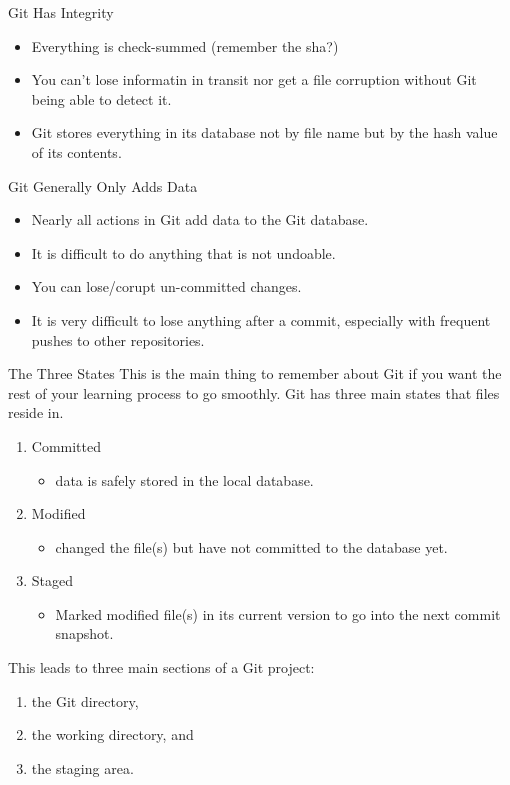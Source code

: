 \begin{frame}[t]{Git Has Integrity}
  \begin{itemize}
    \item Everything is check-summed (remember the sha?)
    \item You can't lose informatin in transit nor get a file corruption without
      Git being able to detect it.
    \item Git stores everything in its database not by file name but by the hash
      value of its contents.
  \end{itemize}
\end{frame}

\begin{frame}[t]{Git Generally Only Adds Data}
  \begin{itemize}
    \item Nearly all actions in Git add data to the Git database.
    \item It is difficult to do anything that is not undoable.
    \item You can lose/corupt un-committed changes.
    \item It is very difficult to lose anything after a commit, especially with
      frequent pushes to other repositories.
  \end{itemize}
\end{frame}

\begin{frame}[t]{The Three States}
  This is the main thing to remember about Git if you want the rest of your
  learning process to go smoothly.  Git has three main states that files reside
  in.

  \begin{enumerate}
    \item Committed
      \begin{itemize}
        \item data is safely stored in the local database.
      \end{itemize}
    \item Modified
      \begin{itemize}
        \item changed the file(s) but have not committed to the database yet.
      \end{itemize}
    \item Staged
      \begin{itemize}
        \item Marked modified file(s) in its current version to go into the next
          commit snapshot.
      \end{itemize}
  \end{enumerate}

  This leads to three main sections of a Git project:
  \begin{enumerate}
    \item the Git directory,
    \item the working directory, and
    \item the staging area.
  \end{enumerate}
\end{frame}

